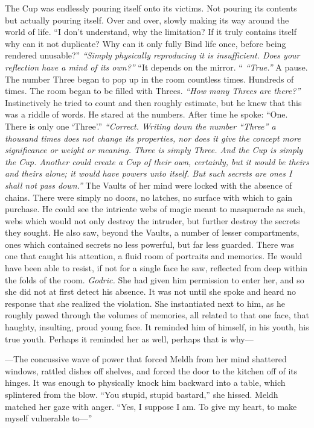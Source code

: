 \begin{flushright}
The Cup was endlessly pouring itself onto its victims. Not pouring its contents but actually pouring itself. Over and over, slowly making its way around the world of life.
\SmallVSpace
“I don’t understand, why the limitation? If it truly contains itself why can it not duplicate? Why can it only fully Bind life once, before being rendered unusable?”
\SmallVSpace
\emph{“Simply physically reproducing it is insufficient. Does your reflection have a mind of its own?”}
\SmallVSpace
“It depends on the mirror. “
\SmallVSpace
\emph{“True.”} A pause. The number Three began to pop up in the room countless times. Hundreds of times. The room began to be filled with Threes. \emph{“How many Threes are there?”}
\SmallVSpace
Instinctively he tried to count and then roughly estimate, but he knew that this was a riddle of words. He stared at the numbers. After time he spoke: “One. There is only one ‘Three’.”
\SmallVSpace
\emph{“Correct. Writing down the number “Three” a thousand times does not change its properties, nor does it give the concept more significance or weight or meaning. Three is simply Three. And the Cup is simply the Cup. Another could create a Cup of their own, certainly, but it would be theirs and theirs alone; it would have powers unto itself. But such secrets are ones I shall not pass down.”}
\SmallVSpace
The Vaults of her mind were locked with the absence of chains. There were simply no doors, no latches, no surface with which to gain purchase. He could see the intricate webs of magic meant to masquerade as such, webs which would not only destroy the intruder, but further destroy the secrets they sought.
\SmallVSpace
He also saw, beyond the Vaults, a number of lesser compartments, ones which contained secrets no less powerful, but far less guarded. There was one that caught his attention, a fluid room of portraits and memories. He would have been able to resist, if not for a single face he saw, reflected from deep within the folds of the room.
\SomeVSpace
\emph{Godric.}
\SomeVSpace
She had given him permission to enter her, and so she did not at first detect his absence. It was not until she spoke and heard no response that she realized the violation.
\SmallVSpace
She instantiated next to him, as he roughly pawed through the volumes of memories, all related to that one face, that haughty, insulting, proud young face. It reminded him of himself, in his youth, his true youth. Perhaps it reminded her as well, perhaps that is why\mbox{---}
\end{flushright}
\mbox{---}The concussive wave of power that forced Meldh from her mind shattered windows, rattled dishes off shelves, and forced the door to the kitchen off of its hinges. It was enough to physically knock him backward into a table, which splintered from the blow.
\SmallVSpace
“You stupid, stupid bastard,” she hissed.
\SmallVSpace
Meldh matched her gaze with anger. “Yes, I suppose I am. To give my heart, to make myself vulnerable to\mbox{---}”

